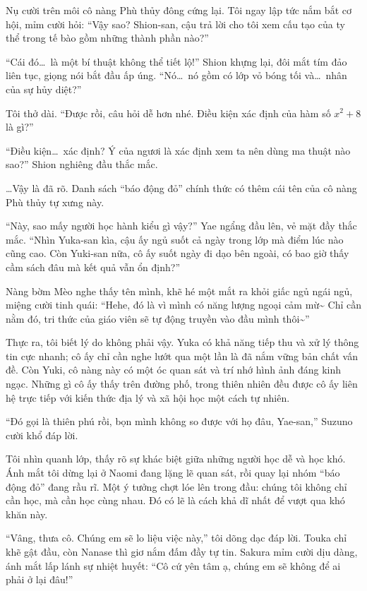 \documentclass[../main.tex]{subfiles}
\begin{document}
Nụ cười trên môi cô nàng Phù thủy đông cứng lại. Tôi ngay lập tức nắm bắt cơ hội, mỉm cười hỏi: ``Vậy sao? Shion-san, cậu trả lời cho tôi xem cấu tạo của ty thể trong tế bào gồm những thành phần nào?''

``Cái đó\dots\ là một bí thuật không thể tiết lộ!'' Shion khựng lại, đôi mắt tím đảo liên tục, giọng nói bắt đầu ấp úng. ``Nó\dots\ nó gồm có lớp vỏ bóng tối và\dots\ nhân của sự hủy diệt?''

Tôi thở dài. ``Được rồi, câu hỏi dễ hơn nhé. Điều kiện xác định của hàm số $x^2 + 8$ là gì?''

``Điều kiện\dots\ xác định? Ý của ngươi là xác định xem ta nên dùng ma thuật nào sao?'' Shion nghiêng đầu thắc mắc.

\dots Vậy là đã rõ. Danh sách ``báo động đỏ'' chính thức có thêm cái tên của cô nàng Phù thủy tự xưng này.

``Này, sao mấy người học hành kiểu gì vậy?'' Yae ngẩng đầu lên, vẻ mặt đầy thắc mắc. ``Nhìn Yuka-san kìa, cậu ấy ngủ suốt cả ngày trong lớp mà điểm lúc nào cũng cao. Còn Yuki-san nữa, cô ấy suốt ngày đi dạo bên ngoài, có bao giờ thấy cầm sách đâu mà kết quả vẫn ổn định?''

Nàng bờm Mèo nghe thấy tên mình, khẽ hé một mắt ra khỏi giấc ngủ ngái ngủ, miệng cười tinh quái: ``Hehe, đó là vì mình có năng lượng ngoại cảm mừ\~{} Chỉ cần nằm đó, tri thức của giáo viên sẽ tự động truyền vào đầu mình thôi\~{}''

Thực ra, tôi biết lý do không phải vậy. Yuka có khả năng tiếp thu và xử lý thông tin cực nhanh; cô ấy chỉ cần nghe lướt qua một lần là đã nắm vững bản chất vấn đề. Còn Yuki, cô nàng này có một óc quan sát và trí nhớ hình ảnh đáng kinh ngạc. Những gì cô ấy thấy trên đường phố, trong thiên nhiên đều được cô ấy liên hệ trực tiếp với kiến thức địa lý và xã hội học một cách tự nhiên.

``Đó gọi là thiên phú rồi, bọn mình không so được với họ đâu, Yae-san,'' Suzuno cười khổ đáp lời.

Tôi nhìn quanh lớp, thấy rõ sự khác biệt giữa những người học dễ và học khó. Ánh mắt tôi dừng lại ở Naomi đang lặng lẽ quan sát, rồi quay lại nhóm ``báo động đỏ'' đang rầu rĩ. Một ý tưởng chợt lóe lên trong đầu: chúng tôi không chỉ cần học, mà cần học cùng nhau. Đó có lẽ là cách khả dĩ nhất để vượt qua khó khăn này.

``Vâng, thưa cô. Chúng em sẽ lo liệu việc này,'' tôi dõng dạc đáp lời. Touka chỉ khẽ gật đầu, còn Nanase thì giơ nắm đấm đầy tự tin. Sakura mỉm cười dịu dàng, ánh mắt lấp lánh sự nhiệt huyết: ``Cô cứ yên tâm ạ, chúng em sẽ không để ai phải ở lại đâu!''
\end{document}
